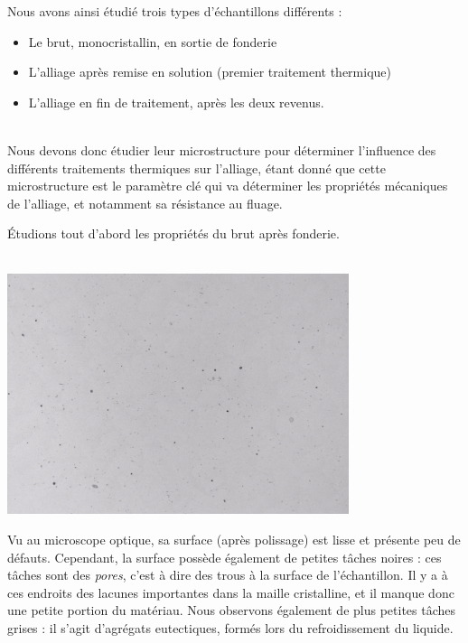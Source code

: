 Nous avons ainsi étudié trois types d'échantillons différents :\\
\begin{itemize}
    \item Le brut, monocristallin, en sortie de fonderie
    \item L'alliage après remise en solution (premier traitement thermique)
    \item L'alliage en fin de traitement, après les deux revenus.\\\\
\end{itemize}



Nous devons donc étudier leur microstructure pour déterminer l'influence des 
différents traitements thermiques sur l'alliage, étant donné que cette microstructure
est le paramètre clé qui va déterminer les propriétés mécaniques de l'alliage,
et notamment sa résistance au fluage.

Étudions tout d'abord les propriétés du brut après fonderie.\\\\


\centerline{\includegraphics[width=0.75\textwidth]{images_optique/brut.pdf}}


Vu au microscope optique, sa surface (après polissage) est lisse
et présente peu de défauts. Cependant, la surface possède 
également de petites tâches noires : ces tâches sont des \emph{pores},
c'est à dire des trous à la surface de l'échantillon. Il y a à ces endroits 
des lacunes importantes dans la maille cristalline, et il manque donc 
une petite portion du matériau. Nous observons également de plus 
petites tâches grises : il s'agit d'agrégats eutectiques, formés lors du refroidissement du liquide.


